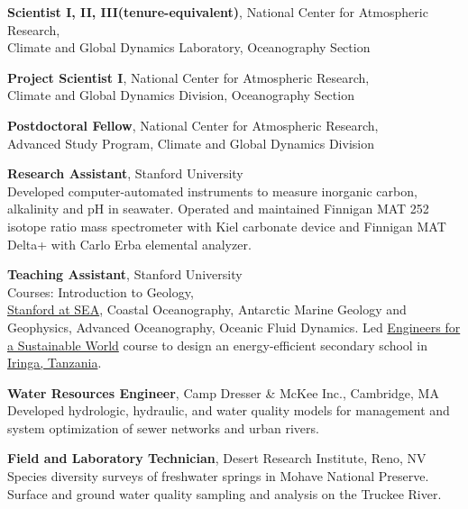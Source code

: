 \documentclass[11pt]{article}
\begin{document}
\begin{description}[style=multiline,leftmargin=2.5cm,font=\normalfont]
\item[2014--present] \textbf{Scientist I, II, III(tenure-equivalent)},
	{National Center for Atmospheric Research}, \\
	{Climate and Global Dynamics Laboratory},
	{Oceanography Section}

\item[2012--2014] \textbf{Project Scientist I},
	{National Center for Atmospheric Research}, \\
	{Climate and Global Dynamics Division},
	{Oceanography Section}

\item[2010--2012] \textbf{Postdoctoral Fellow},
	{National Center for Atmospheric Research}, \\
	{Advanced Study Program}, {Climate and Global Dynamics Division}

\item[2005--2010] \textbf{Research Assistant}, Stanford University\\
	Developed computer-automated instruments to measure
	inorganic carbon, alkalinity and pH in seawater.
	Operated and maintained Finnigan MAT 252 isotope ratio mass spectrometer
	with Kiel carbonate device and Finnigan MAT Delta+ with Carlo Erba elemental analyzer.

\item[2004--2009] \textbf{Teaching Assistant}, Stanford University \\
	Courses: Introduction to Geology,\\
	\href{http://stanford.sea.edu/}{Stanford at SEA},
	Coastal Oceanography, Antarctic Marine Geology and Geophysics,
	Advanced Oceanography, Oceanic Fluid Dynamics.
	Led \href{http://esw.stanford.edu}{Engineers for a Sustainable World} course to
	design an energy-efficient secondary school in
	\href{http://g.co/maps/d9q9a}{Iringa, Tanzania}.

\item[2003--2004] \textbf{Water Resources Engineer},
	{Camp Dresser \& McKee Inc.}, Cambridge, MA\\
	Developed hydrologic, hydraulic, and water quality models for
	management and system optimization of sewer networks and urban rivers.

\item[2003] \textbf{Field and Laboratory Technician},
	{Desert Research Institute}, Reno, NV
	Species diversity surveys of freshwater springs in Mohave National Preserve. \\
	Surface and ground water quality sampling and analysis on the Truckee River.


\end{description}
\end{document}
